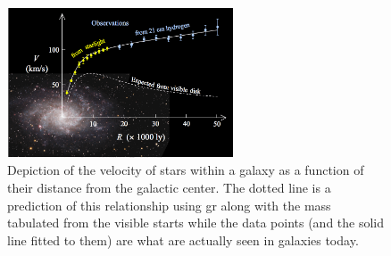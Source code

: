 \begin{figure}
  \centering
  \includegraphics[width=0.6\textwidth]{figures/theory/rotation-curve-evidence-for-dm.png}
  \caption{
    Depiction of the velocity of stars within a galaxy as a function of their distance
    from the galactic center. The dotted line is a prediction of this relationship using
    \ac{gr} along with the mass tabulated from the visible starts while the data points
    (and the solid line fitted to them) are what are actually seen in galaxies today.
  }
  \label{fig:rotation-curve}
\end{figure}

